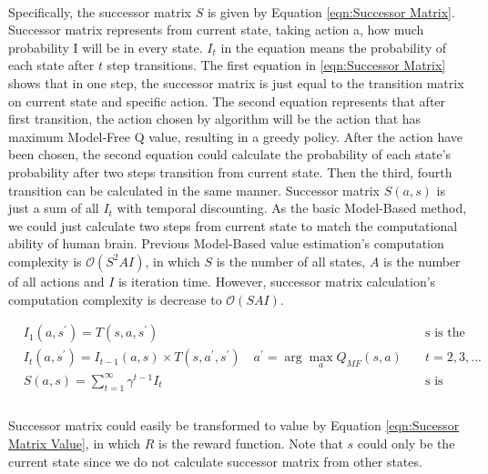 \paragraph{}
Specifically, the successor matrix $S$ is given by Equation \ref{eqn:Successor Matrix}. Successor matrix represents from current state, taking action a, how much probability I will be in every state. $I_t$ in the equation means the probability of each state after $t$ step transitions. The first equation in \ref{eqn:Successor Matrix} shows that in one step, the successor matrix is just equal to the transition matrix on current state and specific action. The second equation represents that after first transition, the action chosen by algorithm will be the action that has maximum Model-Free Q value, resulting in a greedy policy. After the action have been chosen, the second equation could calculate the probability of each state's probability after two steps transition from current state. Then the third, fourth transition can be calculated in the same manner. Successor matrix $S(a,s)$ is just a sum of all $I_t$ with temporal discounting. As the basic Model-Based method, we could just calculate two steps from current state to match the computational ability of human brain. Previous Model-Based value estimation's computation complexity is $\mathcal{O}(S^2AI)$, in which $S$ is the number of all states, $A$ is the number of all actions and $I$ is iteration time. However, successor matrix calculation's computation complexity is decrease to $\mathcal{O}(SAI)$. 

\begin{equation}
\begin{aligned}
&I_1(a,s^{\prime}) = T(s,a,s^{\prime}) &\text{s is the current state} \\
&I_t(a,s^{\prime}) = I_{t-1}(a,s)\times T(s,a^{\prime},s^{\prime}) \quad a^{\prime}=\arg \max_{a}{Q_{MF}(s,a)} \quad & t=2,3,... \\
&S(a,s) = \sum_{t=1}^{\infty}{\gamma^{t-1}I_t} &\text{s is sucessor state} \\
\end{aligned}
\label{eqn:Successor Matrix}
\end{equation}

\paragraph{}
Successor matrix could easily be transformed to value by Equation \ref{eqn:Sucessor Matrix Value}, in which $R$ is the reward function. Note that $s$ could only be the current state since we do not calculate successor matrix from other states. 

